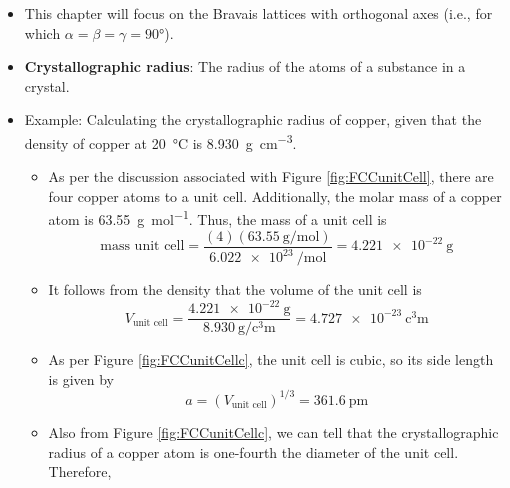 \documentclass[../notes.tex]{subfiles}
\begin{document}
\begin{itemize}
\begin{itemize}
\begin{itemize}
            \item I: Body-centered unit cells.
            \item C: End-centered unit cells.
            \item F: Face-centered unit cells.
            \item R: Rhombohedral unit cells.
        \end{itemize}
    \end{itemize}
    \item This chapter will focus on the Bravais lattices with orthogonal axes (i.e., for which $\alpha=\beta=\gamma=\ang{90}$).
    \item \textbf{Crystallographic radius}: The radius of the atoms of a substance in a crystal.
    \item Example: Calculating the crystallographic radius of copper, given that the density of copper at \SI{20}{\celsius} is \SI{8.930}{\gram\per\cubic\centi\meter}.
    \begin{itemize}
        \item As per the discussion associated with Figure \ref{fig:FCCunitCell}, there are four copper atoms to a unit cell. Additionally, the molar mass of a copper atom is \SI{63.55}{\gram\per\mole}. Thus, the mass of a unit cell is
        \begin{equation*}
            \text{mass unit cell} = \frac{(4)(\SI{63.55}{\gram\per\mole})}{\SI{6.022e23}{\per\mole}}
            = \SI{4.221e-22}{\gram}
        \end{equation*}
        \item It follows from the density that the volume of the unit cell is
        \begin{equation*}
            V_\text{unit cell} = \frac{\SI{4.221e-22}{\gram}}{\SI{8.930}{\gram\per\cubic\centi\meter}}
            = \SI{4.727e-23}{\cubic\centi\meter}
        \end{equation*}
        \item As per Figure \ref{fig:FCCunitCellc}, the unit cell is cubic, so its side length is given by
        \begin{equation*}
            a = (V_\text{unit cell})^{1/3}
            = \SI{361.6}{\pico\meter}
        \end{equation*}
        \item Also from Figure \ref{fig:FCCunitCellc}, we can tell that the crystallographic radius of a copper atom is one-fourth the diameter of the unit cell. Therefore,
        \begin{equation*}

\end{equation*}
\end{itemize}
\end{itemize}
\end{document}
